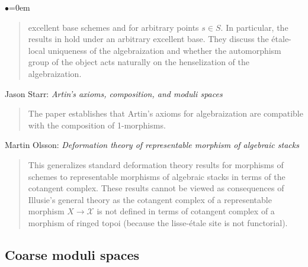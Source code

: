 \begin{list}{$\bullet$}{\leftmargin=0em}
\begin{quote}
excellent base schemes and for arbitrary points $s \in S$.
In particular, the results in \cite{artin_versal} hold under an arbitrary
excellent base. They discuss the \'etale-local uniqueness of the
algebraization and whether the automorphism group of the object acts naturally
on the henselization of the algebraization.
\end{quote}
\smallskip
\item Jason Starr: \emph{Artin's axioms, composition, and moduli spaces}
\cite{starr_artin}
\begin{quote}
The paper establishes that Artin's axioms for algebraization are compatible
with the composition of 1-morphisms.
\end{quote}
\smallskip
\item Martin Olsson: \emph{Deformation theory of representable
morphism of algebraic stacks} \cite{olsson_deformation}
\begin{quote}
This generalizes standard deformation theory results for morphisms of schemes
to representable morphisms of algebraic stacks in terms of the cotangent
complex. These results cannot be viewed as consequences of Illusie's general
theory as the cotangent complex of a representable morphism $X \to \mathcal{X}$
is not
defined in terms of cotangent complex of a morphism of ringed topoi (because
the lisse-\'etale site is not functorial).
\end{quote}
\end{list}

\subsection{Coarse moduli spaces}
\label{subsection-coarse-moduli-spaces}


